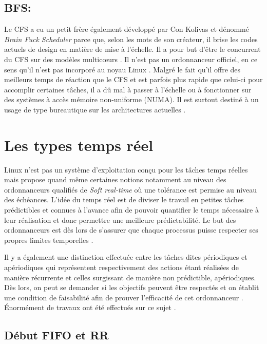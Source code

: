 \documentclass[letterpaper]{article}
\begin{document}
\subsection{BFS:}

Le CFS a eu un petit frère également développé par Con Kolivas et dénommé \textit{Brain Fuck Scheduler} parce que, selon les mots de son créateur, il brise les codes actuels de design en matière de mise à l'échelle. Il a pour but d'être le concurrent du CFS sur des modèles multicœurs \citep{PATCHBFS}. Il n'est pas un ordonnanceur officiel, en ce sens qu'il n'est pas incorporé au noyau Linux \citep{opac-b1133216}. Malgré le fait qu'il offre des meilleurs temps de réaction que le CFS et est parfois plus rapide que celui-ci pour accomplir certaines tâches, il a dû mal à passer à l'échelle ou à fonctionner sur des systèmes à accès mémoire non-uniforme (NUMA). Il est surtout destiné à un usage de type bureautique sur les architectures actuelles \citep{CFSVSBFS}.

\section{Les types temps réel}

Linux n'est pas un système d'exploitation conçu pour les tâches temps réelles mais propose quand même certaines notions notamment au niveau des ordonnanceurs qualifiés de \textit{Soft real-time} où une tolérance est permise au niveau des échéances. L'idée du temps réel est de diviser le travail en petites tâches prédictibles et connues à l'avance afin de pouvoir quantifier le temps nécessaire à leur réalisation et donc permettre une meilleure prédictabilité. Le but des ordonnanceurs est dès lors de s'assurer que chaque processus puisse respecter ses propres limites temporelles \citep{stankovic2012deadline}.

Il y a également une distinction effectuée entre les tâches dites périodiques et apériodiques qui représentent respectivement des actions étant réalisées de manière récurrente et celles surgissant de manière non prédictible, apériodiques. Dès lors, on peut se demander si les objectifs peuvent être respectés et on établit une condition de faisabilité afin de prouver l'efficacité de cet ordonnanceur \citep{128746}. Énormément de travaux ont été effectués sur ce sujet \citep{Sha:2004:RTS:1028913.1028959}.

\subsection{Début FIFO et RR}
\end{document}
